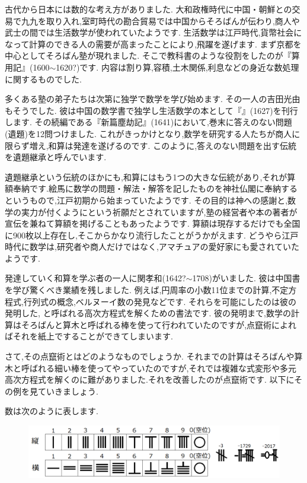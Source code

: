 \documentclass[./main]{subfiles}
\begin{document}


古代から日本には数的な考え方がありました. 大和政権時代に中国・朝鮮との交易で九九を取り入れ,室町時代の勘合貿易では中国からそろばんが伝わり,商人や武士の間では生活数学が使われていたようです. 生活数学は江戸時代,貨幣社会になって計算のできる人の需要が高まったことにより,飛躍を遂げます. まず京都を中心としてそろばん塾が現れました. そこで教科書のような役割をしたのが『算用記』(1600$\sim$1620?)です. 内容は割り算,容積,土木関係,利息などの身近な数処理に関するものでした.

多くある塾の弟子たちは次第に独学で数学を学び始めます. その一人の吉田光由もそうでした. 彼は中国の数学書で独学し生活数学の本として『』(1627)を刊行します. その続編である『新篇塵劫記』(1641)において,巻末に答えのない問題(遺題)を12問つけました. これがきっかけとなり,数学を研究する人たちが商人に限らず増え,和算は発達を遂げるのです. このように,答えのない問題を出す伝統を遺題継承と呼んでいます.

遺題継承という伝統のほかにも,和算にはもう1つの大きな伝統があり,それが算額奉納です.絵馬に数学の問題・解法・解答を記したものを神社仏閣に奉納するというもので,江戸初期から始まっていたようです. その目的は神への感謝と,数学の実力が付くようにという祈願だとされていますが,塾の経営者や本の著者が宣伝を兼ねて算額を掲げることもあったようです. 算額は現存するだけでも全国に900枚以上存在し,そこからかなり流行したことがうかがえます. どうやら江戸時代に数学は,研究者や商人だけではなく,アマチュアの愛好家にも愛されていたようです.

発達していく和算を学ぶ者の一人に関孝和(1642?$\sim$1708)がいました. 彼は中国書を学び驚くべき業績を残しました. 例えば,円周率の小数11位までの計算,不定方程式,行列式の概念,ベルヌーイ数の発見などです. それらを可能にしたのは彼の発明した, と呼ばれる高次方程式を解くための書法です. 彼の発明まで,数学の計算はそろばんと算木と呼ばれる棒を使って行われていたのですが,点竄術によればそれを紙上ですることができてしまいます.



さて,その点竄術とはどのようなものでしょうか. それまでの計算はそろばんや算木と呼ばれる細い棒を使ってやっていたのですが,それでは複雑な式変形や多元高次方程式を解くのに難がありました.それを改善したのが点竄術です. 以下にその例を見ていきましょう.

数は次のように表します.

\begin{figure}[H]
\begin{center}
\includegraphics[width=18cm]{ookuwa0.png}
\end{center}
\end{figure}
\end{document}
